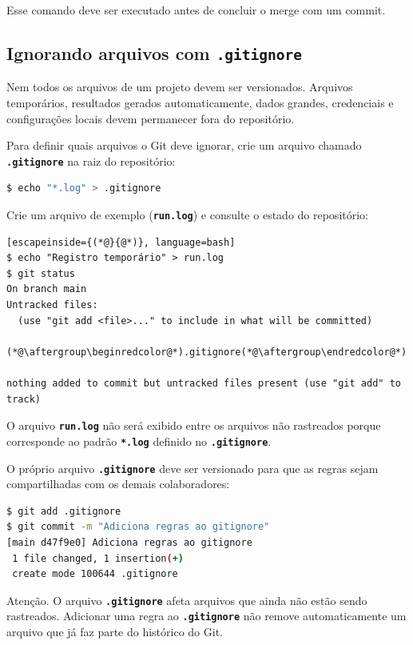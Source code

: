 \documentclass[12pt,a4paper]{article}
\begin{document}
Esse comando deve ser executado antes de concluir o merge com um commit.

\subsection{Ignorando arquivos com \texttt{.gitignore}}

Nem todos os arquivos de um projeto devem ser versionados. Arquivos temporários, resultados gerados automaticamente, dados grandes, credenciais e configurações locais devem permanecer fora do repositório.

Para definir quais arquivos o Git deve ignorar, crie um arquivo chamado \textbf{\texttt{.gitignore}} na raiz do repositório:

\begin{lstlisting}[language=bash]
$ echo "*.log" > .gitignore
\end{lstlisting}

Crie um arquivo de exemplo (\textbf{\texttt{run.log}}) e consulte o estado do repositório:

\begin{lstlisting}[escapeinside={(*@}{@*)}, language=bash]
$ echo "Registro temporário" > run.log
$ git status
On branch main
Untracked files:
  (use "git add <file>..." to include in what will be committed)
        (*@\aftergroup\beginredcolor@*).gitignore(*@\aftergroup\endredcolor@*)

nothing added to commit but untracked files present (use "git add" to track)
\end{lstlisting}

O arquivo \textbf{\texttt{run.log}} não será exibido entre os arquivos não rastreados porque corresponde ao padrão \textbf{\texttt{*.log}} definido no \textbf{\texttt{.gitignore}}.

O próprio arquivo \textbf{\texttt{.gitignore}} deve ser versionado para que as regras sejam compartilhadas com os demais colaboradores:

\begin{lstlisting}[language=bash]
$ git add .gitignore
$ git commit -m "Adiciona regras ao gitignore"
[main d47f9e0] Adiciona regras ao gitignore
 1 file changed, 1 insertion(+)
 create mode 100644 .gitignore
\end{lstlisting}

\begin{question}{Atenção.} 
\footnotesize O arquivo \textbf{\texttt{.gitignore}} afeta arquivos que ainda não estão sendo rastreados. Adicionar uma regra ao \textbf{\texttt{.gitignore}} não remove automaticamente um arquivo que já faz parte do histórico do Git.
\end{question}
\end{document}
